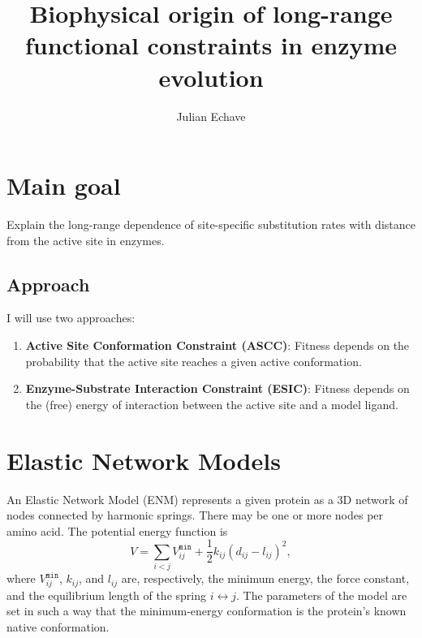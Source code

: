 \documentclass[12pt]{article}
\newcommand{\lij}{l_{ij}}
\newcommand{\kij}{k_{ij}}
\newcommand{\vijMin}{V^{\mathtt{min}}_{ij}}
\begin{document}
\title{Biophysical origin of long-range functional constraints in enzyme evolution}
\author{Julian Echave}
\date{}


\maketitle



\section{Main goal}

Explain the long-range dependence of site-specific substitution rates with distance from the active site in enzymes.

\subsection{Approach}
I will use two approaches:

\begin{enumerate}

\item \textbf{Active Site Conformation Constraint (ASCC)}: Fitness depends on the probability that the active site reaches a given active conformation.

\item \textbf{Enzyme-Substrate Interaction Constraint (ESIC)}: Fitness depends on the (free) energy of interaction between the active site and a model ligand.

\end{enumerate}


\section{Elastic Network Models}

An Elastic Network Model (ENM)  represents a given protein as a 3D network of nodes connected by harmonic springs. There may be one or more nodes per amino acid. The potential energy function is 
\begin{equation} \label{eq:vENM}
\boxed{
V =   \sum_{i<j} \vijMin +\frac{1}{2}\kij (d_{ij}-\lij)^2,
}
\end{equation}
where $\vijMin$, $\kij$, and $\lij$ are, respectively, the minimum energy, the force constant, and the equilibrium length of the spring $i \leftrightarrow j$. The parameters of the model are set in such a way that the minimum-energy conformation is the protein's known native conformation.
\end{document}
